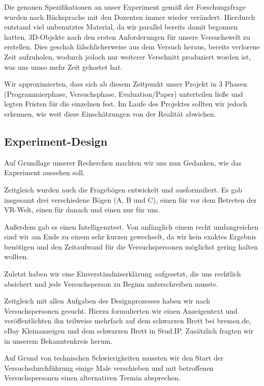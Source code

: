 \documentclass{Bericht}
\begin{document}
		Die genauen Spezifikationen an unser Experiment gemäß der Forschungsfrage wurden nach Rücksprache mit den Dozenten immer wieder verändert. Hierdurch entstand viel unbenutztes Material, da wir parallel bereits damit begonnen hatten, 3D-Objekte nach den ersten Anforderungen für unsere Versuchswelt zu erstellen. Dies geschah fälschlicherweise aus dem Versuch heraus, bereits verlorene Zeit aufzuholen, wodurch jedoch nur weiterer Verschnitt produziert worden ist, was uns umso mehr Zeit gekostet hat.

		Wir approximierten, dass sich ab diesem Zeitpunkt unser Projekt in 3 Phasen (Programmierphase, Versuchsphase, Evaluation/Paper) unterteilen ließe und legten Fristen für die einzelnen fest. Im Laufe des Projektes sollten wir jedoch erkennen, wie weit diese Einschätzungen von der Realität abwichen.

	\subsection{Experiment-Design} %
		Auf Grundlage unserer Recherchen machten wir uns nun Gedanken, wie das Experiment aussehen soll. 
		
		Zeitgleich wurden auch die Fragebögen entwickelt und ausformuliert. Es gab insgesamt drei verschiedene Bögen (A, B und C), einen für vor dem Betreten der VR-Welt, einen für danach und einen nur für uns.
			
		Außerdem gab es einen Intelligenztest. Von anfänglich einem recht umfangreichen sind wir am Ende zu einem sehr kurzen gewechselt, da wir kein exaktes Ergebnis benötigen und den Zeitaufwand für die Versuchspersonen möglichst gering halten wollten.
			
		Zuletzt haben wir eine Einverständniserklärung aufgesetzt, die uns rechtlich absichert und jede Versuchsperson zu Beginn unterschreiben musste.
			
		Zeitgleich mit allen Aufgaben des Designprozesses haben wir nach Versuchspersonen gesucht. Hierzu formulierten wir einen Anzeigentext und veröffentlichten ihn teilweise mehrfach auf dem schwarzen Brett bei bremen.de, eBay Kleinanzeigen und dem schwarzen Brett in Stud.IP. Zusätzlich fragten wir in unserem Bekanntenkreis herum. 
			
		Auf Grund von technischen Schwierigkeiten mussten wir den Start der Versuchsdurchführung einige Male verschieben und mit betroffenen Versuchspersonen einen alternativen Termin absprechen. 
\end{document}
